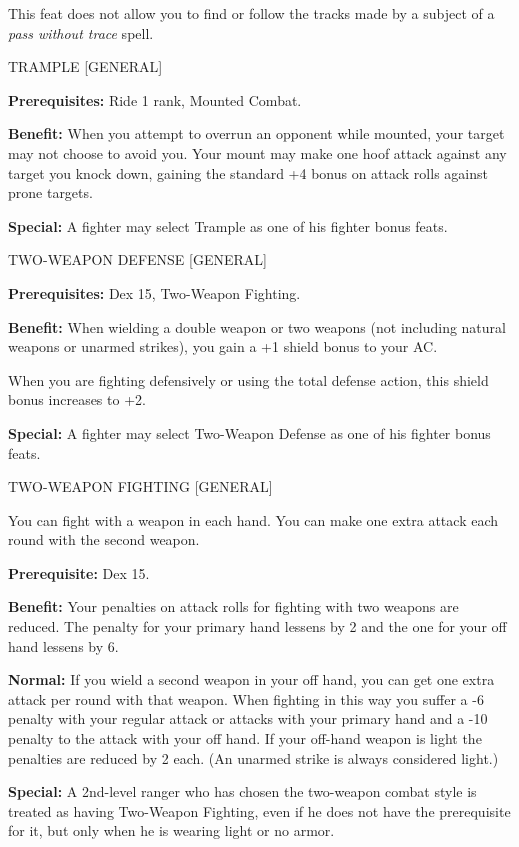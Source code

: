 \documentclass{article}
\begin{document}
This feat does not allow you to find or follow the tracks made by a subject of 
a \textit{pass without trace }spell.

\vspace{12pt}
TRAMPLE [GENERAL]

\textbf{Prerequisites:} Ride 1 rank, Mounted Combat.

\textbf{Benefit:} When you attempt to overrun an opponent while mounted, your target 
may not choose to avoid you. Your mount may make one hoof attack against any target 
you knock down, gaining the standard +4 bonus on attack rolls against prone targets.

\textbf{Special:} A fighter may select Trample as one of his fighter bonus feats.

\vspace{12pt}
TWO-WEAPON DEFENSE [GENERAL]

\textbf{Prerequisites:} Dex 15, Two-Weapon Fighting.

\textbf{Benefit: }When wielding a double weapon or two weapons (not including natural 
weapons or unarmed strikes), you gain a +1 shield bonus to your AC.

When you are fighting defensively or using the total defense action, this shield 
bonus increases to +2.

\textbf{Special:} A fighter may select Two-Weapon Defense as one of his fighter 
bonus feats.

\vspace{12pt}
TWO-WEAPON FIGHTING [GENERAL]

You can fight with a weapon in each hand. You can make one extra attack each round 
with the second weapon.

\textbf{Prerequisite:} Dex 15.

\textbf{Benefit:} Your penalties on attack rolls for fighting with two weapons 
are reduced. The penalty for your primary hand lessens by 2 and the one for your 
off hand lessens by 6.

\textbf{Normal:} If you wield a second weapon in your off hand, you can get one 
extra attack per round with that weapon. When fighting in this way you suffer a 
-6 penalty with your regular attack or attacks with your primary hand and a -10 
penalty to the attack with your off hand. If your off-hand weapon is light the 
penalties are reduced by 2 each. (An unarmed strike is always considered light.)

\textbf{Special:} A 2nd-level ranger who has chosen the two-weapon combat style 
is treated as having Two-Weapon Fighting, even if he does not have the prerequisite 
for it, but only when he is wearing light or no armor.
\end{document}
